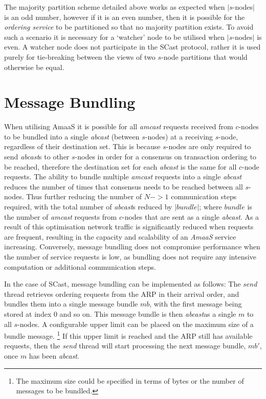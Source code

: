     The majority partition scheme detailed above works as expected when $|s$-nodes$|$ is an odd number, however if it is an even number, then it is possible for the \emph{ordering service} to be partitioned so that no majority partition exists.  To avoid such a scenario it is necessary for a \textquoteleft{}watcher' node to be utilised when $|s$-nodes$|$ is even.  A watcher node does not participate in the \textsf{SCast} protocol, rather it is used purely for tie-breaking between the views of two $s$-node partitions that would otherwise be equal.  

\section{Message Bundling}\label{ssec:abaas_optimisations}
		When utilising \textsf{AmaaS} it is possible for all \emph{amcast} requests received from $c$-nodes to be bundled into a single \emph{abcast} (between $s$-nodes) at a receiving $s$-node, regardless of their destination set.  This is because $s$-nodes are only required to send \emph{abcast}s to other $s$-nodes in order for a consensus on transaction ordering to be reached, therefore the destination set for each \emph{abcast} is the same for all $c$-node requests.   The ability to bundle multiple \emph{amcast} requests into a single \emph{abcast} reduces the number of times that consensus needs to be reached between all $s$-nodes.  Thus further reducing the number of $N->1$ communication steps required, with the total number of \emph{abcast}s reduced by $\left\vert bundle \right\vert$; where $bundle$ is the number of  \emph{amcast} requests from $c$-nodes that are sent as a single \emph{abcast}.  As a result of this optimisation network traffic is significantly reduced when requests are frequent, resulting in the capacity and scalability of an \emph{AmaaS} service increasing. Conversely, message bundling does not compromise performance when the number of service requests is low, as bundling does not require any intensive computation or additional communication steps.  
    
    In the case of \textsf{SCast}, message bundling can be implemented as follows: The \emph{send} thread retrieves ordering requests from the ARP in their arrival order, and bundles them into a single message bundle $mb$, with the first message being stored at index 0 and so on.  This message bundle is then \emph{abcast}as a single $m$ to all $s$-nodes.  A configurable upper limit can be placed on the maximum size of a bundle message. \footnote{The maximum size could be specified in terms of bytes or the number of messages to be bundled.} If this upper limit is reached and the ARP still has available requests, then the \emph{send} thread will start processing the next message bundle, $mb'$, once $m$ has been \emph{abcast}.  
    
